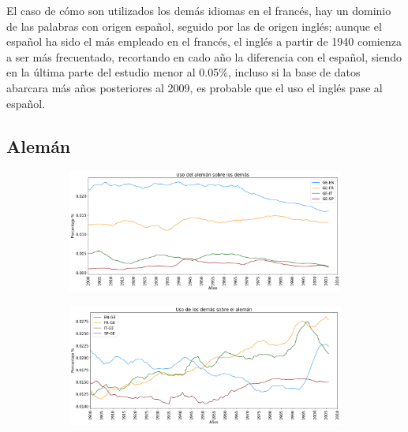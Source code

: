 El caso de cómo son utilizados los demás idiomas en el francés,  hay un dominio de las palabras con origen español, seguido por las de origen inglés; aunque el español ha sido el más empleado en el francés,  el inglés a partir de 1940 comienza a ser más frecuentado,  recortando en cado año la diferencia con el español,  siendo en la última parte del estudio  menor al 0.05$\%$, incluso si la base de datos abarcara más años posteriores al 2009, es probable que el uso el inglés pase al español. 


\newpage
\subsection{Alemán}

\begin{figure}[h!]
	
	\begin{subfigure}{}
		\centering
		\includegraphics[scale=.38]{Cap_4/PF1_S2_GE.png}
		\caption{}
		\label{fig:ST_GE_a}
	\end{subfigure}
	
	\begin{subfigure}{}
		\centering
		\includegraphics[scale=.38]{Cap_4/PF2_S2_GE.png}
		\caption{}
		\label{fig:ST_GE_b}
	\end{subfigure}
	
\end{figure}

